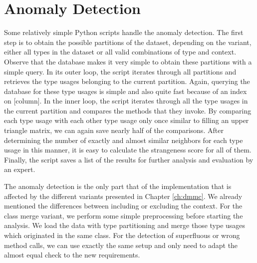 \section{Anomaly Detection}\label{sec:anomaly}


Some relatively simple Python scripts handle the anomaly detection.
The first step is to obtain the possible partitions of the dataset, depending on the variant, either all types in the dataset or all valid combinations of type and context.
Observe that the database makes it very simple to obtain these partitions with a simple query.
In its outer loop, the script iterates through all partitions and retrieves the type usages belonging to the current partition.
Again, querying the database for these type usages is simple and also quite fast because of an index on [column].
In the inner loop, the script iterates through all the type usages in the current partition and compares the methods that they invoke.
By comparing each type usage with each other type usage only once similar to filling an upper triangle matrix, we can again save nearly half of the comparisons.
After determining the number of exactly and almost similar neighbors for each type usage in this manner, it is easy to calculate the strangeness score for all of them.
Finally, the script saves a list of the results for further analysis and evaluation by an expert.

The anomaly detection is the only part that of the implementation that is affected by the different variants presented in Chapter \ref{ch:dmmc}.
We already mentioned the differences between including or excluding the context.
For the class merge variant, we perform some simple preprocessing before starting the analysis.
We load the data with type partitioning and merge those type usages which originated in the same class.
For the detection of superfluous or wrong method calls, we can use exactly the same setup and only need to adapt the almost equal check to the new requirements.


